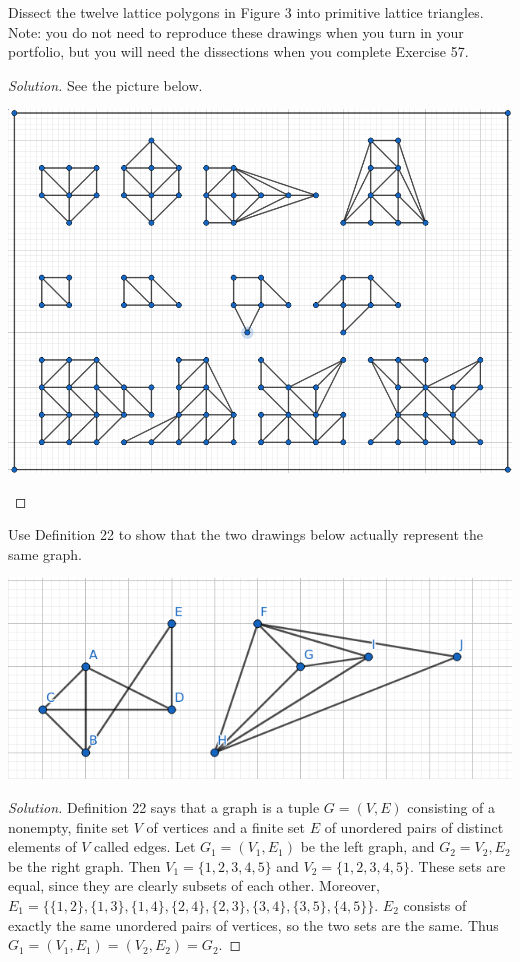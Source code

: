 \documentclass[12pt]{article}
\newenvironment{exercise}[2][Exercise]{\begin{trivlist}
        \item[\hskip \labelsep {\bfseries #1}\hskip \labelsep {\bfseries #2.}]}{\end{trivlist}}
\newenvironment{solution}
        {\begin{proof}[Solution]}
                    {\end{proof}}
\begin{document}
\begin{exercise}{47}
    Dissect the twelve lattice polygons in Figure 3 into primitive lattice triangles. Note: you do not need to reproduce these drawings when you turn in your portfolio, but you will need the dissections when you complete Exercise 57.
    \begin{solution}
        See the picture below.
        \begin{center}
            \includegraphics[scale=.5]{47}
        \end{center}
    \end{solution}
\end{exercise}

\begin{exercise}{48}
    Use Definition 22 to show that the two drawings below actually represent the same graph.
    \begin{center}
        \includegraphics[width=.5\linewidth]{48}
    \end{center}
    \begin{solution}
        Definition 22 says that a graph is a tuple \( G = (V, E) \) consisting of a nonempty, finite set \( V \) of vertices and a finite set \( E \) of unordered pairs of distinct elements of \( V \) called edges. Let \( G_{1} = (V_{1} , E_{1}) \) be the left graph, and \( G_{2} = V_{2} , E_{2} \) be the right graph. Then \( V_{1} = \{1, 2, 3, 4, 5\} \) and \( V_{2} = \{1,2,3,4,5\} . \) These sets are equal, since they are clearly subsets of each other. Moreover, \( E_{1} = \{\{1,2\} , \{1, 3\} , \{1,4\}, \{2, 4\}, \{2,3\} , \{3,4\} , \{3, 5\} , \{4,5\} \} . \) \( E_{2} \) consists of exactly the same unordered pairs of vertices, so the two sets are the same. Thus \( G_{1} = (V_{1} , E_{1}) = (V_{2} , E_{2}) = G_{2} . \)
    \end{solution}
\end{exercise}
\end{document}
